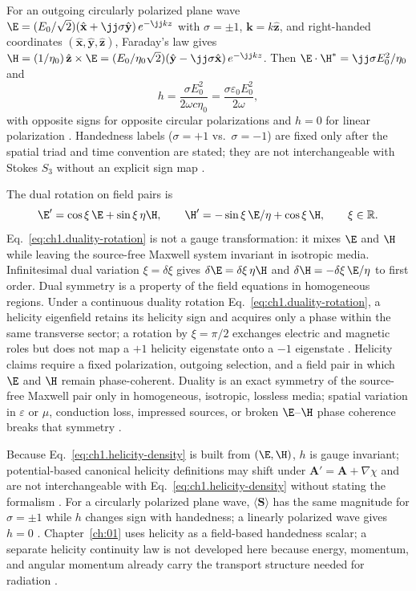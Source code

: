 For an outgoing circularly polarized plane wave
\(\E=(E_0/\sqrt{2})(\hat{\mathbf{x}}+\jj\sigma\hat{\mathbf{y}})\,e^{-\jj kz}\) with
\(\sigma=\pm1\), \(\mathbf{k}=k\hat{\mathbf{z}}\), and right-handed coordinates
\((\hat{\mathbf{x}},\hat{\mathbf{y}},\hat{\mathbf{z}})\), Faraday's law gives
\(\H=(1/\eta_0)\,\hat{\mathbf{z}}\times\E
=(E_0/\eta_0\sqrt{2})(\hat{\mathbf{y}}-\jj\sigma\hat{\mathbf{x}})\,e^{-\jj kz}\).
Then \(\E\cdot\H^*=\jj\sigma E_0^2/\eta_0\) and
\begin{equation}
\label{eq:ch1.helicity-plane-wave}
h=\frac{\sigma E_0^2}{2\omega c\eta_0}
=\frac{\sigma\varepsilon_0 E_0^2}{2\omega},
\end{equation}
with opposite signs for opposite circular polarizations and $h=0$ for linear polarization
\cite{stratton1941,belinfante1940}. Handedness labels ($\sigma=+1$ vs.\ $\sigma=-1$) are fixed
only after the spatial triad and time convention are stated; they are not interchangeable
with Stokes $S_3$ without an explicit sign map \cite{stratton1941}.

The dual rotation on field pairs is
\begin{equation}
\label{eq:ch1.duality-rotation}
\E'=\cos\xi\,\E+\sin\xi\,\eta\H,\qquad
\H'=-\sin\xi\,\E/\eta+\cos\xi\,\H,\qquad \xi\in\mathbb{R}.
\end{equation}
Eq.~\eqref{eq:ch1.duality-rotation} is not a gauge transformation: it
mixes \(\E\) and \(\H\) while leaving the source-free Maxwell system invariant in
isotropic media. Infinitesimal dual variation \(\xi=\delta\xi\) gives
\(\delta\E=\delta\xi\,\eta\H\) and \(\delta\H=-\delta\xi\,\E/\eta\) to first order.
Dual symmetry is a property of the field equations in homogeneous regions. Under a continuous
duality rotation Eq.~\eqref{eq:ch1.duality-rotation}, a helicity eigenfield retains its
helicity sign and acquires only a phase within the same transverse sector; a rotation by
\(\xi=\pi/2\) exchanges electric and magnetic roles but does not map a \(+1\) helicity
eigenstate onto a \(-1\) eigenstate \cite{stratton1941}. Helicity claims require a fixed
polarization, outgoing selection, and a field pair in which \(\E\) and \(\H\) remain
phase-coherent. Duality is an exact symmetry of the source-free Maxwell pair only in homogeneous, isotropic, lossless media; spatial variation in \(\varepsilon\) or \(\mu\), conduction loss, impressed sources, or broken \(\E\)--\(\H\) phase coherence breaks that symmetry \cite{stratton1941}.

Because Eq.~\eqref{eq:ch1.helicity-density} is built from $(\E,\H)$, $h$ is gauge invariant; potential-based canonical helicity definitions may shift under $\mathbf{A}'=\mathbf{A}+\nabla\chi$ and are not interchangeable with Eq.~\eqref{eq:ch1.helicity-density} without stating the formalism \cite{belinfante1940,tai1994,jackson1999}. For a circularly polarized plane wave, $\langle\mathbf{S}\rangle$ has the same magnitude for $\sigma=\pm1$ while $h$ changes sign with handedness; a linearly polarized wave gives $h=0$ \cite{stratton1941}. Chapter~\ref{ch:01} uses helicity as a field-based handedness scalar; a separate helicity continuity law is not developed here because energy, momentum, and angular momentum already carry the transport structure needed for radiation \cite{stratton1941}.

